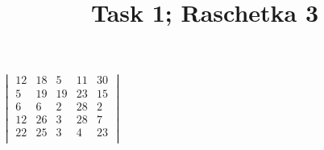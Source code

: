\documentclass{article}
\begin{document}
\title{Task 1; Raschetka 3}
\date{}
\maketitle
$
\begin{vmatrix}
12 & 18 & 5 & 11 & 30\\
5 & 19 & 19 & 23 & 15\\
6 & 6 & 2 & 28 & 2\\
12 & 26 & 3 & 28 & 7\\
22 & 25 & 3 & 4 & 23\\
\end{vmatrix}
$
\end{document}
